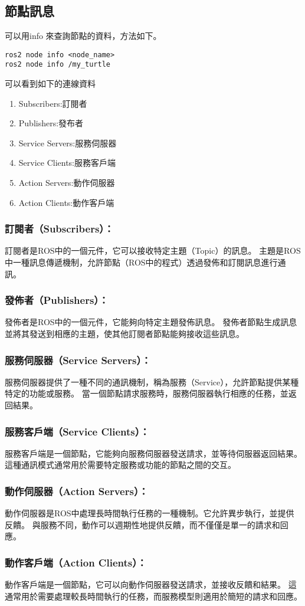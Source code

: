 \subsection{節點訊息}
    可以用info 來查詢節點的資料，方法如下。
\begin{verbatim}
ros2 node info <node_name>
ros2 node info /my_turtle
\end{verbatim}
可以看到如下的連線資料
\begin{enumerate}
    \item  Subscribers:訂閱者
    \item  Publishers:發布者
    \item  Service Servers:服務伺服器
    \item  Service Clients:服務客戶端
    \item  Action Servers:動作伺服器
    \item  Action Clients:動作客戶端
\end{enumerate}
\subsubsection{訂閱者（Subscribers）：}

訂閱者是ROS中的一個元件，它可以接收特定主題（Topic）的訊息。
主題是ROS中一種訊息傳遞機制，允許節點（ROS中的程式）透過發佈和訂閱訊息進行通訊。
\subsubsection{發佈者（Publishers）：}

發佈者是ROS中的一個元件，它能夠向特定主題發佈訊息。
發佈者節點生成訊息並將其發送到相應的主題，使其他訂閱者節點能夠接收這些訊息。
\subsubsection{服務伺服器（Service Servers）：}

服務伺服器提供了一種不同的通訊機制，稱為服務（Service），允許節點提供某種特定的功能或服務。
當一個節點請求服務時，服務伺服器執行相應的任務，並返回結果。
\subsubsection{服務客戶端（Service Clients）：}

服務客戶端是一個節點，它能夠向服務伺服器發送請求，並等待伺服器返回結果。
這種通訊模式通常用於需要特定服務或功能的節點之間的交互。
\subsubsection{動作伺服器（Action Servers）：}

動作伺服器是ROS中處理長時間執行任務的一種機制。它允許異步執行，並提供反饋。
與服務不同，動作可以週期性地提供反饋，而不僅僅是單一的請求和回應。
\subsubsection{動作客戶端（Action Clients）：}

動作客戶端是一個節點，它可以向動作伺服器發送請求，並接收反饋和結果。
這通常用於需要處理較長時間執行的任務，而服務模型則適用於簡短的請求和回應。
